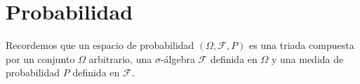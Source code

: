 \documentclass[14pt]{extbook}
\begin{document}
\chapter{Probabilidad}
Recordemos que un espacio de probabilidad $(\Omega, \mathcal{F}, P)$ es una triada compuesta por un conjunto $\Omega$ arbitrario, una $\sigma$-álgebra $\mathcal{F}$ definida en $\Omega$ y una medida de probabilidad $P$ definida en $\mathcal{F}$.	
\end{document}
